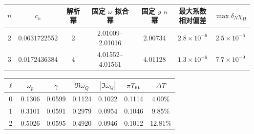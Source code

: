 \documentclass[UTF8,fontset=fandol,11pt,a4paper]{ctexart}
\begin{document}
\par\addvspace{12pt}\noindent\begin{minipage}{\linewidth}
\centering\fontsize{9.5}{12}\selectfont\setlength{\tabcolsep}{3pt}\renewcommand{\arraystretch}{1.18}
\label{audit:tab:power-l0}
\begin{adjustbox}{max width=\linewidth}
\begin{tabular}{c c c c c c c}
\toprule
$n$ & $c_n$ & 解析幂 & \shortstack{固定 $\omega$\\拟合幂}
& \shortstack{固定 $y$\\$\kappa$ 幂} & \shortstack{最大系数\\相对偏差} & $\max\delta_N\chi_H$\\
\midrule
2 & 0.0631722552 & 2 & 2.01009--2.01016 & 2.00734 & $2.8\times10^{-6}$ & $2.5\times10^{-6}$\\
3 & 0.0172436384 & 4 & 4.01552--4.01561 & 4.01128 & $1.3\times10^{-6}$ & $7.7\times10^{-9}$\\
\bottomrule\end{tabular}\end{adjustbox}
\end{minipage}\par\addvspace{9pt}


\par\addvspace{12pt}\noindent\begin{minipage}{\linewidth}
\centering\fontsize{9.5}{12}\selectfont\setlength{\tabcolsep}{3pt}\renewcommand{\arraystretch}{1.18}
\label{audit:tab:fit}
\begin{adjustbox}{max width=\linewidth}
\begin{tabular}{c c c c c c c}
\toprule
$\ell$ & $\omega_p$ & $\gamma$
& $\Re\omega_Q$
& $|\Im\omega_Q|$
& $\pi T_{\rm fit}$
& $\Delta T$\\
\midrule
0 & 0.1306 & 0.0599 & 0.1124 & 0.1022 & 0.1114 & 4.00\%\\
1 & 0.3101 & 0.0591 & 0.2979 & 0.0954 & 0.1046 & 9.85\%\\
2 & 0.5026 & 0.0595 & 0.4920 & 0.0946 & 0.1012 & 12.81\%\\
\bottomrule\end{tabular}\end{adjustbox}
\end{minipage}\par\addvspace{9pt}
\end{document}
